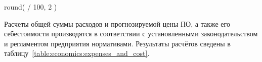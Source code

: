 

 { round( \totalExpense * \supportAndAdaptationRate / 100, 2 )}








Расчеты общей суммы расходов и прогнозируемой цены ПО, а также его себестоимости производятся в соответствии с установленными законодательством и регламентом предприятия нормативами. Результаты расчётов сведены в таблицу~\ref{table:economics:expenses_and_cost}.


